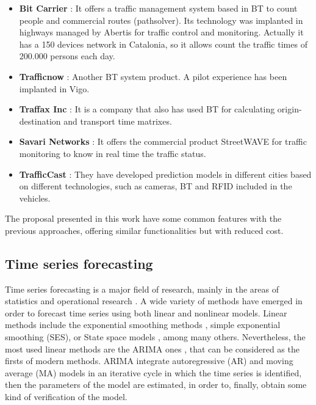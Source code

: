 \documentclass[preprint,authoryear,12pt]{elsarticle}
\begin{document}
\begin{itemize}

\item \textbf{Bit Carrier} \cite{patenteBC} \cite{BitCarrier}: It offers a traffic management system based in BT to count people and commercial routes (pathsolver). Its technology was implanted in highways managed by Abertis for traffic control and monitoring. Actually it has a 150 devices network in Catalonia, so it allows count the traffic times of 200.000 persons each day.
 
\item \textbf{Trafficnow} \cite{Trafficnow}: Another BT system product. A pilot experience has been implanted in Vigo.

 \item \textbf{Traffax Inc} \cite{TraffaxInc}: It is a company that also has used BT for calculating origin-destination and transport time matrixes.

 \item \textbf{Savari Networks} \cite{SavariNetworks}: It offers the commercial product StreetWAVE for traffic monitoring to know in real time the traffic status.


 \item \textbf{TrafficCast} \cite{TrafficCast}: They have developed prediction models in different cities based on different technologies, such as cameras, BT and RFID included in the vehicles.

\end{itemize}

The proposal presented in this work have some common features with the previous approaches, offering similar functionalities but with reduced cost.

\subsection{Time series forecasting}
\label{subsec:time-series}
Time series forecasting is a major field of research, mainly in the areas of statistics \cite{Gooijer25years} and operational research \cite{Fildes2008}. A wide variety of methods have emerged in order to forecast time series using both linear and nonlinear models. Linear methods include the exponential smoothing methods \cite{Brown1959,Winters1960}, simple exponential smoothing (SES), or State space models \cite{Snyder1985}, among many others. Nevertheless, the most used linear methods are the ARIMA ones \cite{BoxJenk}, that can be considered as the firsts of modern methods. ARIMA integrate autoregressive (AR) and moving average (MA) models in an iterative cycle in which the time series is identified, then the parameters of the model are estimated, in order to, finally, obtain some kind of verification of the model.
\end{document}
